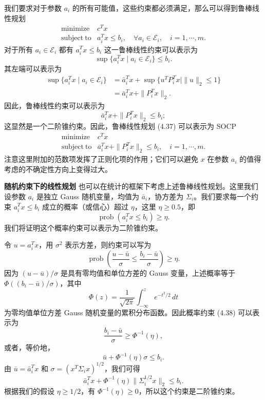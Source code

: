 \documentclass[UTF8, 12pt, fontset=fandol, oneside]{ctexart}
\begin{document}
我们要求对于参数 $a_i$ 的所有可能值，这些约束都必须满足，那么可以得到鲁棒线性规划
\begin{equation}
\begin{array}{ll}
\mathop{\mathrm{minimize}} & c^Tx\\
\mathrm{subject\ to} & a_i^Tx\leq b_i,\quad \forall a_i\in\mathcal{E}_i,\quad i=1,\cdots,m.
\end{array}
\tag{4.37}
\end{equation}
对于所有 $a_i\in\mathcal{E}_i$ 都有 $a_i^Tx\leq b_i$ 这一鲁棒线性约束可以表示为
\[
\sup\{a_i^Tx\mid a_i\in\mathcal{E}_i\}\leq b_i.
\]
其左端可以表示为
\[
\begin{aligned}
\sup\{a_i^Tx\mid a_i\in\mathcal{E}_i\}
&=\bar a_i^Tx+\sup\{u^TP_i^Tx\mid \|u\|_2\leq 1\}\\
&=\bar a_i^Tx+\|P_i^Tx\|_2.
\end{aligned}
\]
因此，鲁棒线性约束可以表示为
\[
\bar a_i^Tx+\|P_i^Tx\|_2\leq b_i;
\]
这显然是一个二阶锥约束。因此，鲁棒线性规划 (4.37) 可以表示为 SOCP
\[
\begin{array}{ll}
\mathop{\mathrm{minimize}} & c^Tx\\
\mathrm{subject\ to} & \bar a_i^Tx+\|P_i^Tx\|_2\leq b_i,\quad i=1,\cdots,m.
\end{array}
\]
注意这里附加的范数项发挥了正则化项的作用；它们可以避免 $x$ 在参数 $a_i$ 的值得考虑的不确定性方向上变得过大。

\noindent\textbf{随机约束下的线性规划}\quad
也可以在统计的框架下考虑上述鲁棒线性规划。这里我们设参数 $a_i$ 是独立 Gauss 随机变量，均值为 $\bar a_i$，协方差为 $\Sigma_i$。我们要求每一个约束 $a_i^Tx\leq b_i$ 成立的概率（或信心）超过 $\eta$，这里 $\eta\geq 0.5$，即
\begin{equation}
\operatorname{prob}(a_i^Tx\leq b_i)\geq \eta.
\tag{4.38}
\end{equation}
我们将证明这个概率约束可以表示为二阶锥约束。

令 $u=a_i^Tx$，用 $\sigma^2$ 表示方差，则约束可以写为
\[
\operatorname{prob}\left(\frac{u-\bar u}{\sigma}\leq \frac{b_i-\bar u}{\sigma}\right)\geq \eta.
\]
因为 $(u-\bar u)/\sigma$ 是具有零均值和单位方差的 Gauss 变量，上述概率等于 $\Phi((b_i-\bar u)/\sigma)$，其中
\[
\Phi(z)=\frac{1}{\sqrt{2\pi}}\int_{-\infty}^z e^{-t^2/2}\,dt
\]
为零均值单位方差 Gauss 随机变量的累积分布函数。因此概率约束 (4.38) 可以表示为
\[
\frac{b_i-\bar u}{\sigma}\geq \Phi^{-1}(\eta),
\]
或者，等价地，
\[
\bar u+\Phi^{-1}(\eta)\sigma\leq b_i.
\]
由 $\bar u=\bar a_i^Tx$ 和 $\sigma=(x^T\Sigma_i x)^{1/2}$，我们可得
\[
\bar a_i^Tx+\Phi^{-1}(\eta)\|\Sigma_i^{1/2}x\|_2\leq b_i.
\]
根据我们的假设 $\eta\geq 1/2$，有 $\Phi^{-1}(\eta)\geq 0$，所以这个约束是二阶锥约束。
\end{document}
